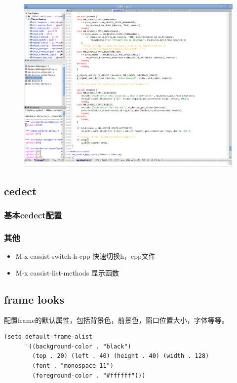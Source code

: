 \documentclass[adobefonts]{ctexart}
\begin{document}
\begin{figure}[htbp]
  \includegraphics[width=15cm]{ecb-cscope.png}
\end{figure}

\subsection{cedect}
\subsubsection{基本cedect配置}
\subsubsection{其他}
\begin{itemize}
	\item M-x eassist-switch-h-cpp 快速切换h，cpp文件
	\item M-x eassist-list-methods 显示函数
\end{itemize}

\subsection{frame looks}
配置frame的默认属性，包括背景色，前景色，窗口位置大小，字体等等。
\begin{verbatim}
(setq default-frame-alist
      '((background-color . "black")
        (top . 20) (left . 40) (height . 40) (width . 128)
        (font . "monospace-11")
        (foreground-color . "#ffffff")))
\end{verbatim}
\end{document}
